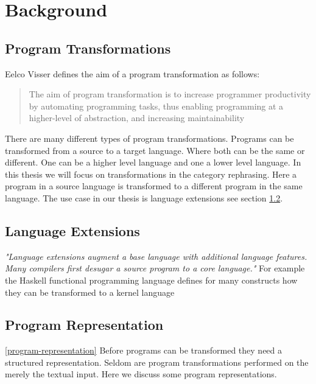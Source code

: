 
\chapter{Background} %

\label{Chapter2}


\section{Program Transformations}

Eelco Visser defines the aim of a program transformation as follows:

\blockquote[\cite{Visser2001}]{The aim of program transformation is to increase programmer productivity by automating programming tasks, thus enabling programming at a higher-level of abstraction, and increasing maintainability}

There are many different types of program transformations. Programs can be transformed from a source to a target language. Where both can be the same or different. One can be a higher level language and one a lower level language. In this thesis we will focus on transformations in the category rephrasing\cite{Visser2001}. Here a program in a source language is transformed to a different program in the same language. The use case in our thesis is language extensions see section \ref{lang-ext}.

\section{Language Extensions} \label{lang-ext}
\textit{"Language extensions augment a base language with additional language features. Many compilers first desugar a source program to a core language."}\cite{Erdweg2014} For example the Haskell functional programming language defines for many constructs how they can be transformed to a kernel language\cite{PeytonJones}

\section{Program Representation} \ref{program-representation}
Before programs can be transformed they need a structured representation. Seldom are program transformations performed on the merely the textual input. Here we discuss some program representations.

